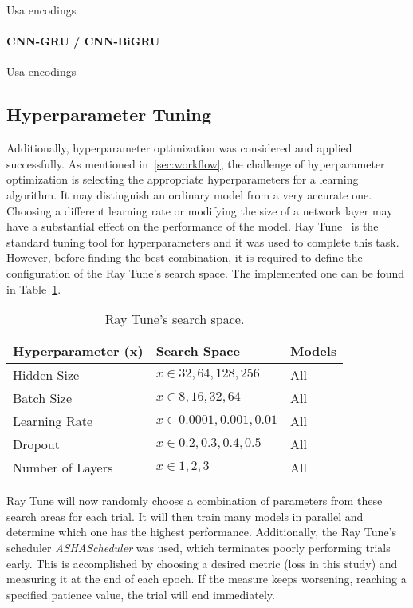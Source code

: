 Usa encodings

\paragraph{CNN-GRU / CNN-BiGRU}

Usa encodings

\subsection{Hyperparameter Tuning}

Additionally, hyperparameter optimization was considered and applied successfully. As mentioned in~\ref{sec:workflow}, the challenge of hyperparameter optimization is selecting the appropriate hyperparameters for a learning algorithm. It may distinguish an ordinary model from a very accurate one. Choosing a different learning rate or modifying the size of a network layer may have a substantial effect on the performance of the model. Ray Tune~\cite{Liaw2018Tune:Training} is the standard tuning tool for hyperparameters and it was used to complete this task. However, before finding the best combination, it is required to define the configuration of the Ray Tune's search space. The implemented one can be found in Table~\ref{tab:search_space}.

\begin{table}[ht]
	\caption{Ray Tune's search space.}
	\label{tab:search_space}
    \centering
    \begin{tabular}{lll}
    	\toprule
    	\textbf{Hyperparameter (x)} & \textbf{Search Space} & \textbf{Models} \\\midrule
    	
    	Hidden Size & $x \in 32, 64, 128, 256$ & All\\\midrule
        Batch Size & $x \in 8, 16, 32, 64$ & All\\\midrule
        Learning Rate & $x \in 0.0001, 0.001, 0.01$ & All\\\midrule
        Dropout & $x \in 0.2, 0.3, 0.4, 0.5$ & All\\\midrule
        Number of Layers & $x \in 1, 2, 3$ & All\\
        
    	\bottomrule
    \end{tabular}
\end{table}

Ray Tune will now randomly choose a combination of parameters from these search areas for each trial. It will then train many models in parallel and determine which one has the highest performance. Additionally, the Ray Tune's scheduler \textit{ASHAScheduler} was used, which terminates poorly performing trials early. This is accomplished by choosing a desired metric (loss in this study) and measuring it at the end of each epoch. If the measure keeps worsening, reaching a specified patience value, the trial will end immediately. 

